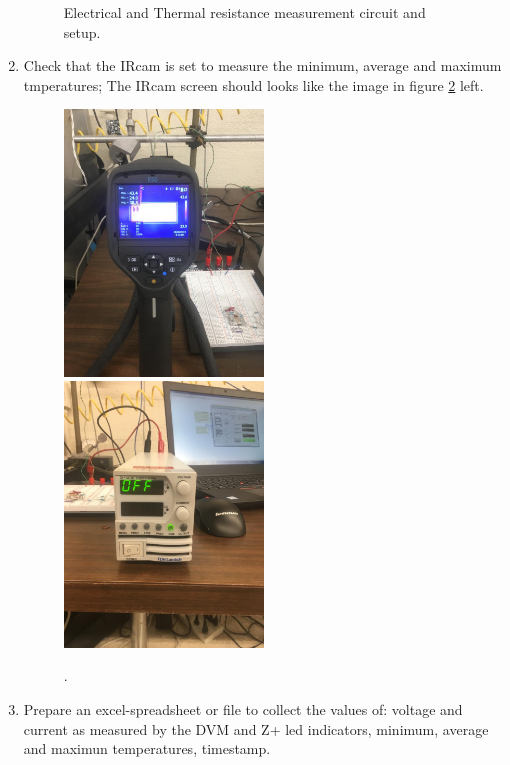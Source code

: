 \documentclass[12pt]{unlsilabsop}
\begin{document}
\begin{enumerate}
\begin{figure}[h!]
\begin{center}
          \caption{Electrical and Thermal resistance measurement circuit and setup.}
          \label{Rm_circuit}
          \end{center}
        \end{figure}
    \item Check that the IRcam is set to measure the minimum, average and maximum tmperatures; The IRcam screen should looks like the image in figure \ref{ircam_setup} left.  
      \begin{center}
        \begin{figure}[h!]
          \includegraphics[width=0.5\textwidth]{img/ircam_setup}
          \includegraphics[width=0.5\textwidth]{img/z+.png}
          \caption{.}
          \label{ircam_setup}
        \end{figure}
      \end{center}
    \item Prepare an excel-spreadsheet or file to collect the values of: voltage and current as measured by the DVM and Z+ led indicators, minimum, average and maximun temperatures, timestamp. 

\end{enumerate}
\end{document}
